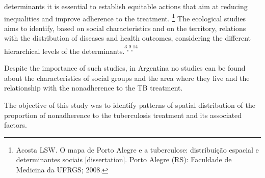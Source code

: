 \begin{multicols}{2}
determinants it is essential to establish equitable actions that aim at reducing inequalities and improve adherence to the treatment. \protect\footnote{ Acosta LSW. O mapa de Porto Alegre e a tuberculose: distribuição espacial e determinantes sociais [dissertation]. Porto Alegre (RS): Faculdade de Medicina da UFRGS; 2008.} The ecological studies aims to identify, based on social characteristics and on the territory, relations with the distribution of diseases and health outcomes, considering the different hierarchical levels of the determinants.\textsuperscript{\textsuperscript{3}}\textsuperscript{,}\textsuperscript{\textsuperscript{9}}\textsuperscript{,}\textsuperscript{\textsuperscript{14}}\par{}Despite the importance of such studies, in Argentina no studies can be found about the characteristics of social groups and the area where they live and the relationship with the nonadherence to the TB treatment.\par{}The objective of this study was to identify patterns of spatial distribution of the proportion of nonadherence to the tuberculosis treatment and its associated factors.

\end{multicols}

